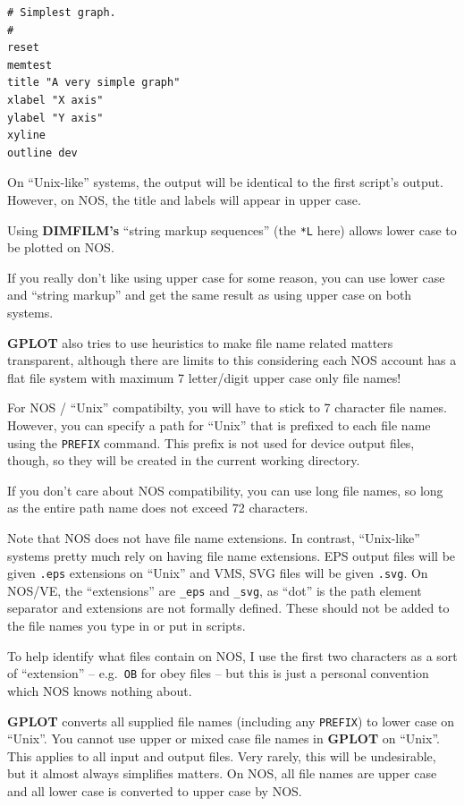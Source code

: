 \documentclass[a4paper,twoside,11pt]{article}
\newcommand{\newpara}{\par\vspace{4mm}\noindent}
\begin{document}
\begin{lstlisting}
# Simplest graph.
#
reset
memtest
title "A very simple graph"
xlabel "X axis"
ylabel "Y axis"
xyline
outline dev
\end{lstlisting}

\newpara
On ``Unix-like'' systems, the output will be identical to the first
script's output. However, on NOS, the title and labels will appear in
upper case.

\newpara
Using \textbf{DIMFILM's} ``string markup sequences'' (the \texttt{*L} here)
allows lower case to be plotted on NOS.

\newpara
If you really don't like using upper case for some reason, you can use
lower case and ``string markup'' and get the same result as using upper
case on both systems.

\newpara
\textbf{GPLOT} also tries to use heuristics to make file name related matters
transparent, although there are limits to this considering each NOS
account has a flat file system with maximum 7 letter/digit upper case
only file names!

\newpara
For NOS / ``Unix'' compatibilty, you will have to stick to 7 character
file names. However, you can specify a path for ``Unix'' that is
prefixed to each file name using the \texttt{PREFIX} command. This
prefix is not used for device output files, though, so they will be
created in the current working directory.

\newpara
If you don't care about NOS compatibility, you can use long file names,
so long as the entire path name does not exceed 72 characters.

\newpara
Note that NOS does not have file name extensions. In contrast,
``Unix-like'' systems pretty much rely on having file name extensions.
EPS output files will be given \texttt{.eps} extensions on ``Unix'' and VMS,
SVG files will be given \texttt{.svg}. On NOS/VE, the ``extensions'' are
\texttt{\_eps} and \texttt{\_svg}, as ``dot'' is the path element separator
and extensions are not formally defined. These should not be added to the file names you
type in or put in scripts.

\newpara
To help identify what files contain on NOS, I use the first two
characters as a sort of ``extension'' -- e.g.~\texttt{OB} for obey files
-- but this is just a personal convention which NOS knows nothing about.

\newpara
\textbf{GPLOT} converts all supplied file names (including any \texttt{PREFIX})
to lower case on ``Unix''. You cannot use upper or mixed case file names
in \textbf{GPLOT} on ``Unix''. This applies to all input and output files. Very
rarely, this will be undesirable, but it almost always simplifies
matters. On NOS, all file names are upper case and all lower case is
converted to upper case by NOS.
\end{document}
